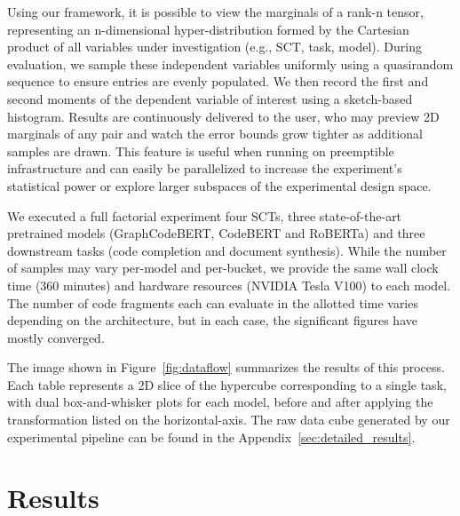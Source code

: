 \documentclass[usenames,dvipsnames]{article} %
\begin{document}
  Using our framework, it is possible to view the marginals of a rank-n tensor, representing an n-dimensional hyper-distribution formed by the Cartesian product of all variables under investigation (e.g., SCT, task, model). During evaluation, we sample these independent variables uniformly using a quasirandom sequence to ensure entries are evenly populated. We then record the first and second moments of the dependent variable of interest using a sketch-based histogram. Results are continuously delivered to the user, who may preview 2D marginals of any pair and watch the error bounds grow tighter as additional samples are drawn. This feature is useful when running on preemptible infrastructure and can easily be parallelized to increase the experiment's statistical power or explore larger subspaces of the experimental design space.

  We executed a full factorial experiment four SCTs, three state-of-the-art pretrained models (GraphCodeBERT, CodeBERT and RoBERTa) and three downstream tasks (code completion and document synthesis). While the number of samples may vary per-model and per-bucket, we provide the same wall clock time (360 minutes) and hardware resources (NVIDIA Tesla V100) to each model. The number of code fragments each can evaluate in the allotted time varies depending on the architecture, but in each case, the significant figures have mostly converged.

  The image shown in Figure~\ref{fig:dataflow} summarizes the results of this process. Each table represents a 2D slice of the hypercube corresponding to a single task, with dual box-and-whisker plots for each model, before and after applying the transformation listed on the horizontal-axis. The raw data cube generated by our experimental pipeline can be found in the Appendix~\ref{sec:detailed_results}.

  \section{Results}\label{sec:results}
\end{document}
